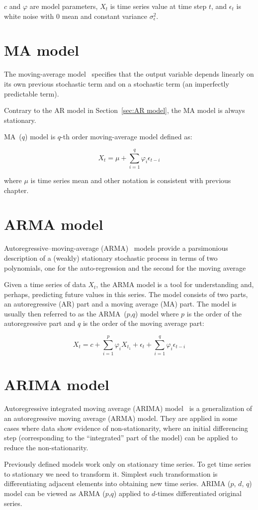 $c$ and $\varphi$ are model parameters, $X_t$ is time series value at time step $t$, and $\epsilon_t$ is white noise with 0 mean and constant variance $\sigma_{\epsilon}^2$.

\section{MA model}
\label{sec:MA model}
The moving-average model~\cite{tsa} specifies that the output variable depends linearly on its own previous stochastic term and on a stochastic term (an imperfectly predictable term).

Contrary to the AR model in Section~\ref{sec:AR model}, the MA model is always stationary.

MA~($q$) model is $q$-th order moving-average model defined as:

\begin{equation*}
  X_t = \mu + \sum_{i=1}^q{\varphi_i \epsilon_{t-i}}
\end{equation*}

where $\mu$ is time series mean and other notation is consistent with previous chapter.

\section{ARMA model}
\label{sec:ARMA model}

Autoregressive–moving-average (ARMA)~\cite{tsa} models provide a parsimonious description of a (weakly) stationary stochastic process in terms of two polynomials, one for the auto-regression and the second for the moving average

Given a time series of data $X_t$, the ARMA model is a tool for understanding and, perhaps, predicting future values in this series. The model consists of two parts, an autoregressive (AR) part and a moving average (MA) part. The model is usually then referred to as the ARMA~($p$,$q$) model where $p$ is the order of the autoregressive part and $q$ is the order of the moving average part:

\begin{equation*}
  X_t = c + \sum_{i=1}^p{\varphi_i X_{t_1}} + \epsilon_t + \sum_{i=1}^q{\varphi_i \epsilon_{t-i}}
\end{equation*}


\section{ARIMA model}
\label{sec:ARIMA model}

Autoregressive integrated moving average (ARIMA) model~\cite{tsa} is a generalization of an autoregressive moving average (ARMA) model. They are applied in some cases where data show evidence of non-stationarity, where an initial differencing step (corresponding to the “integrated” part of the model) can be applied to reduce the non-stationarity.

Previously defined models work only on stationary time series. To get time
series to stationary we need to transform it. Simplest such transformation is
differentiating adjacent elements into obtaining new time series. ARIMA ($p$,
$d$, $q$) model can be viewed as ARMA ($p$,$q$) applied to $d$-times differentiated original series.
